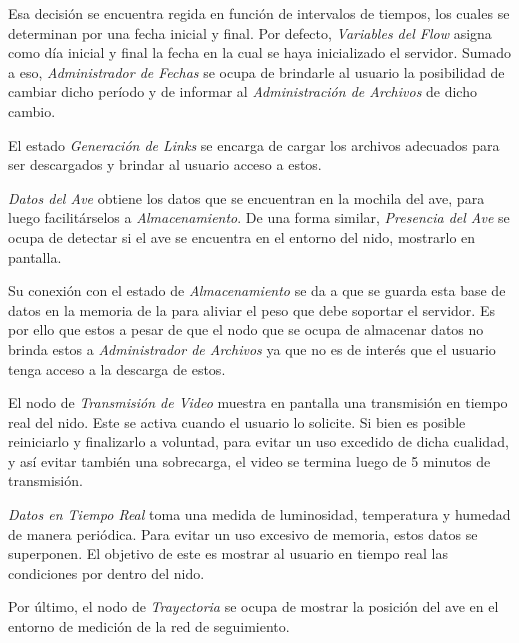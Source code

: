 Esa decisión se encuentra regida en función de intervalos de tiempos, los cuales se determinan por una fecha inicial y final. Por defecto, \textit{Variables del Flow} asigna como día inicial y final la fecha en la cual se haya inicializado el servidor. Sumado a eso, \textit{Administrador de Fechas} se ocupa de brindarle al usuario la posibilidad de cambiar dicho período y de informar al \textit{Administración de Archivos} de dicho cambio.

El estado \textit{Generación de Links} se encarga de cargar los archivos adecuados para ser descargados y brindar al usuario acceso a estos.

\textit{Datos del Ave} obtiene los datos que se encuentran en la mochila del ave, para luego facilitárselos a \textit{Almacenamiento}. De una forma similar, \textit{Presencia del Ave} se ocupa de detectar si el ave se encuentra en el entorno del nido, mostrarlo en pantalla.

Su conexión con el estado de \textit{Almacenamiento} se da a que se guarda esta base de datos en la memoria de la \rpi para aliviar el peso que debe soportar el servidor. Es por ello que estos a pesar de que el nodo que se ocupa de almacenar datos no brinda estos a \textit{Administrador de Archivos} ya que no es de interés que el usuario tenga acceso a la descarga de estos.

El nodo de \textit{Transmisión de Video} muestra en pantalla una transmisión en tiempo real del nido. Este se activa cuando el usuario lo solicite. Si bien es posible reiniciarlo y finalizarlo a voluntad, para evitar un uso excedido de dicha cualidad, y así evitar también una sobrecarga, el video se termina luego de 5 minutos de transmisión.

\textit{Datos en Tiempo Real} toma una medida de luminosidad, temperatura y humedad de manera periódica. Para evitar un uso excesivo de memoria, estos datos se superponen. El objetivo de este es mostrar al usuario en tiempo real las condiciones por dentro del nido.

Por último, el nodo de \textit{Trayectoria} se ocupa de mostrar la posición del ave en el entorno de medición de la red de seguimiento.